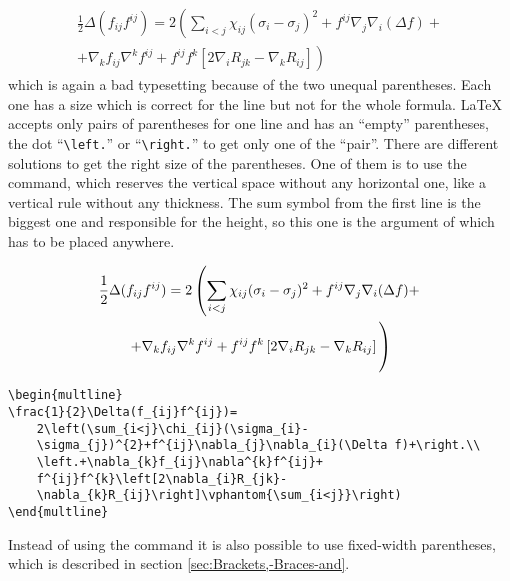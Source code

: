 \begin{table}[htb]
\begin{multline}
\frac{1}{2}\Delta(f_{ij}f^{ij})=2\left(\sum_{i<j}\chi_{ij}(\sigma_{i}-\sigma_{j})^{2}
  +f^{ij}\nabla_{j}\nabla_{i}(\Delta f)+\right.\\
+\left.\nabla_{k}f_{ij}\nabla^{k}f^{ij}+f^{ij}f^{k}\left[2\nabla_{i}R_{jk}-\nabla_{k}R_{ij}
 \right]\right)
\end{multline}
%
which is again a bad typesetting because of the two unequal parentheses.
Each one has a size which is correct for the line but not for the
whole formula. \LaTeX{} accepts only pairs of parentheses for one
line and has an ``empty{}'' parentheses, the dot ``\texttt{\textbackslash{}left.}''
or ``\texttt{\textbackslash{}right.}''{} to get only one of the ``pair{}''.
There are different solutions to get the right size of the parentheses.
One of them is to use the  command,
which reserves the vertical space without any horizontal one, like
a vertical rule without any thickness. The sum symbol from the first
line is the biggest one and responsible for the height, so this one is
the argument of  which has to be
placed anywhere.

\begin{multline}
\frac{1}{2}\Delta(f_{ij}f^{ij})=
	2\left(\sum_{i<j}\chi_{ij}(\sigma_{i}-
	\sigma_{j})^{2}+f^{ij}\nabla_{j}\nabla_{i}(\Delta f)+\right.\\
	\left.+\nabla_{k}f_{ij}\nabla^{k}f^{ij}+
	f^{ij}f^{k}\left[2\nabla_{i}R_{jk}-
	\nabla_{k}R_{ij}\right]\vphantom{\sum_{i<j}}\right)
\end{multline}
%
\begin{lstlisting}[xleftmargin=-1cm,xrightmargin=-1.5cm]
\begin{multline}
\frac{1}{2}\Delta(f_{ij}f^{ij})=
	2\left(\sum_{i<j}\chi_{ij}(\sigma_{i}-
	\sigma_{j})^{2}+f^{ij}\nabla_{j}\nabla_{i}(\Delta f)+\right.\\
	\left.+\nabla_{k}f_{ij}\nabla^{k}f^{ij}+
	f^{ij}f^{k}\left[2\nabla_{i}R_{jk}-
	\nabla_{k}R_{ij}\right]\vphantom{\sum_{i<j}}\right)
\end{multline}
\end{lstlisting}
%
Instead of using the  command it is
also possible to use fixed-width parentheses, which is described in
section \vref{sec:Brackets,-Braces-and}.



\end{table}
